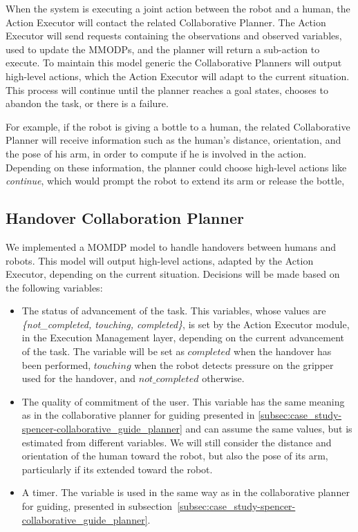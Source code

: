 When the system is executing a joint action between the robot and a human, the Action Executor will contact the related Collaborative Planner.  The Action Executor will send requests containing the observations and observed variables, used to update the MMODPs, and the planner will return a sub-action to execute. To maintain this model generic the Collaborative Planners will output high-level actions, which the Action Executor will adapt to the current situation. This process will continue until the planner reaches a goal states, chooses to abandon the task, or there is a failure.

For example, if the robot is giving a bottle to a human, the related Collaborative Planner will receive information such as the human's distance, orientation, and the pose of his arm, in order to compute if he is involved in the action. Depending on these information, the planner could choose high-level actions like \textit{continue}, which would prompt the robot to extend its arm or release the bottle, 

\subsection{Handover Collaboration Planner}
\label{subsec:case_study-helper-handover}
We implemented a MOMDP model to handle handovers between humans and robots. This model will output high-level actions, adapted by the Action Executor, depending on the current situation. Decisions will be made based on the following variables:

\begin{itemize}
\item The status of advancement of the task. This variables, whose values are \textit{\{not\_completed, touching, completed\}}, is set by the Action Executor module, in the Execution Management layer, depending on the current advancement of the task. The variable will be set as $completed$ when the handover has been performed, $touching$ when the robot detects pressure on the gripper used for the handover, and $not\_completed$ otherwise. 
\item The quality of commitment of the user. This variable has the same meaning as in the collaborative planner for guiding presented in \ref{subsec:case_study-spencer-collaborative_guide_planner} and can assume the same values, but is estimated from different variables. We will still consider the distance and orientation of the human toward the robot, but also the pose of its arm, particularly if its extended toward the robot. 
\item A timer. The variable is used in the same way as in the collaborative planner for guiding, presented in subsection~\ref{subsec:case_study-spencer-collaborative_guide_planner}.
\end{itemize}

